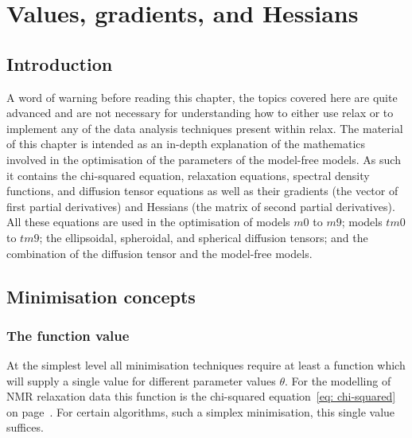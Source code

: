 
\chapter{Values, gradients, and Hessians} \label{ch: values, gradients, and Hessians}




\section{Introduction}


A word of warning before reading this chapter, the topics covered here are quite advanced and are not necessary for understanding how to either use relax or to implement any of the data analysis techniques present within relax.  The material of this chapter is intended as an in-depth explanation of the mathematics involved in the optimisation of the parameters of the model-free models.  As such it contains the chi-squared equation, relaxation equations, spectral density functions, and diffusion tensor equations as well as their gradients (the vector of first partial derivatives) and Hessians (the matrix of second partial derivatives).  All these equations are used in the optimisation of models $m0$ to $m9$; models $tm0$ to $tm9$; the ellipsoidal, spheroidal, and spherical diffusion tensors; and the combination of the diffusion tensor and the model-free models.




\section{Minimisation concepts}

\subsection{The function value}

At the simplest level all minimisation techniques require at least a function which will supply a single value for different parameter values $\theta$.  For the modelling of NMR relaxation data this function is the chi-squared equation~\eqref{eq: chi-squared} on page~\pageref{eq: chi-squared}.  For certain algorithms, such a simplex minimisation, this single value suffices.


